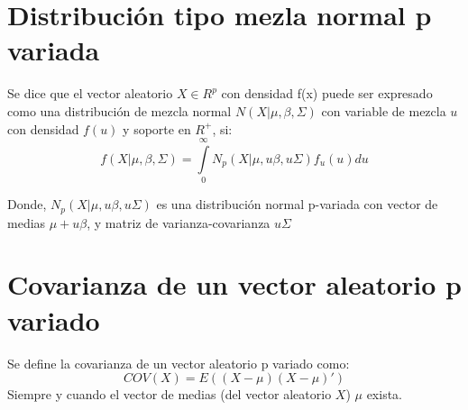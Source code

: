 \documentclass[11pt]{book}
\begin{document}
\section{Distribución tipo mezla normal p variada}
Se dice que el vector aleatorio $X\in R^{p}$ con densidad f(x) puede ser expresado como una distribución de mezcla normal $N(X|\mu,\beta,\Sigma)$ con variable de mezcla $u$ con densidad $f(u)$ y soporte en $R^{+}$, si:
\begin{equation*}
f(X|\mu,\beta,\Sigma)=\underset{0}{\overset{\infty }{\int }}N_{p}(X|\mu,u\beta,u\Sigma)f_{u}(u)du 
\end{equation*}

Donde, $N_{p}(X|\mu,u\beta,u\Sigma)$ es una distribución normal p-variada con vector de medias $\mu+u\beta$, y matriz de varianza-covarianza $u\Sigma$

\section{Covarianza de un vector aleatorio p variado}
Se define la covarianza de un vector aleatorio p variado como:
\begin{equation*}
COV(X)=E((X-\mu)(X-\mu)')
\end{equation*}
Siempre y cuando el vector de medias (del vector aleatorio $X$) $\mu$ exista.
\end{document}
